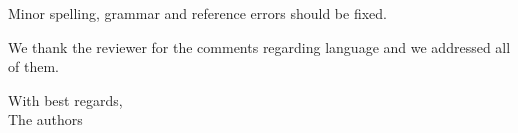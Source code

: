 \documentclass{article}
\begin{document}
 
 
 
 
 
 
\vspace*{1cm}
\begin{tcolorbox}
Minor spelling, grammar and reference errors should be fixed.
\end{tcolorbox}
We thank the reviewer for the comments regarding language and we addressed all of them.
 
\vspace*{1cm}
 
 
 
With best regards, \\
  The authors
\end{document}
